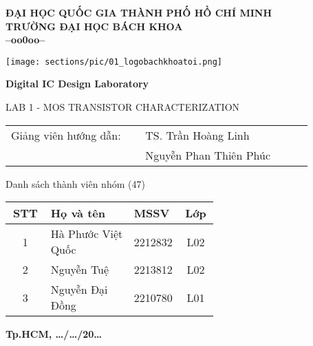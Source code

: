 \BgThispage
\thispagestyle{empty}
\begin{center}
	\Large\textbf{ĐẠI HỌC QUỐC GIA THÀNH PHỐ HỒ CHÍ MINH \\ TRƯỜNG ĐẠI HỌC BÁCH KHOA\\--oo0oo--}
\end{center}
\vspace{0.5cm}
\begin{center}
	\texttt{[image: sections/pic/01\_logobachkhoatoi.png]}
\end{center}
\vspace{0.4cm}
\begin{center}
	\LARGE\textbf{Digital IC Design Laboratory}
	\vspace{0.1cm}
	
	\Large{LAB 1 - MOS TRANSISTOR CHARACTERIZATION}
\end{center}
\vspace{1cm}

\LARGE

\hspace{2cm}\begin{tabular}{p{0.4\linewidth} p{0.5\linewidth}}
	Giảng viên hướng dẫn: & TS. Trần Hoàng Linh \\
						  & Nguyễn Phan Thiên Phúc \\
\end{tabular}

\vspace{0.5cm}
\begin{center}
	Danh sách thành viên nhóm (47)
	
	\begin{tabular}{|c|p{0.4\linewidth}|p{0.2\linewidth}| c |}
		\hline
		STT & Họ và tên & MSSV & Lớp\\
		\hline
		1 & Hà Phước Việt Quốc & 2212832 & L02\\
		\hline
		2 & Nguyễn Tuệ & 2213812 & L02\\
		\hline
		3 & Nguyễn Đại Đồng & 2210780 & L01\\
		\hline
	\end{tabular}
\end{center}

\vspace{1cm}
\begin{center}
	\fontsize{8pt}{5pt}\selectfont\textbf{Tp.HCM, \dots/\dots/20\dots}
\end{center}

\newpage
\thispagestyle{empty}
\fontsize{13}{14}\selectfont
\tableofcontents
\listoffigures